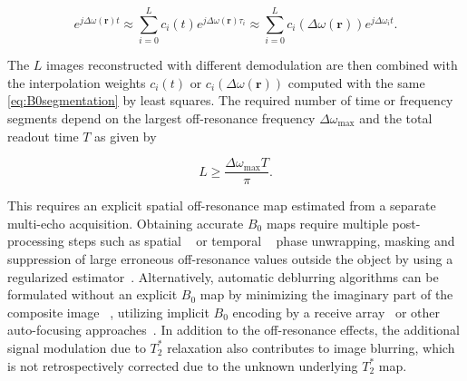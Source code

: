 \begin{equation}
	e^{j\Delta\omega(\textbf{r}) t}  \approx \sum_{i=0}^{L} c_i(t)e^{j\Delta\omega(\textbf{r})\tau_i} \approx \sum_{i=0}^{L} c_i(\Delta\omega(\textbf{r}))e^{j\Delta\omega_it}.
	\label{eq:B0segmentation}
\end{equation}

The $L$ images reconstructed with different demodulation are then combined with the interpolation weights $c_i(t)$ or $c_i(\Delta\omega(\textbf{r}))$ computed with the same \cref{eq:B0segmentation} by least squares. The required number of time or frequency segments depend on the largest off-resonance frequency $\Delta\omega_{\text{max}}$ and the total readout time $T$ as given by 

\begin{equation}
	L\geq \dfrac{\Delta\omega_{\text{max}}T}{\pi}.
	\label{eq:levels}
\end{equation}

This requires an explicit spatial off-resonance map estimated from a separate multi-echo acquisition. Obtaining accurate $B_0$ maps require multiple post-processing steps such as spatial ~\cite{abdul-rahmanFastRobustThreedimensional2007} or temporal ~\cite{robinsonMethodUnwrappingHighly2014} phase unwrapping, masking and suppression of large erroneous off-resonance values outside the object by using a regularized estimator~\cite{fesslerRegularizedFieldmapEstimation2006}. Alternatively, automatic deblurring algorithms can be formulated without an explicit $B_0$ map by minimizing the imaginary part of the composite image ~\cite{nollDeblurringNon2DFourier1992}, utilizing implicit $B_0$ encoding by a receive array~\cite{patzigReconstructionStrategiesMRI2022,patzigOffResonanceSelfCorrectionImplicit2021} or other auto-focusing approaches~\cite{smithAutomaticOffresonanceCorrection2013}. In addition to the off-resonance effects, the additional signal modulation due to $T_2^*$ relaxation also contributes to image blurring, which is not retrospectively corrected due to the unknown underlying $T_2^*$ map.

